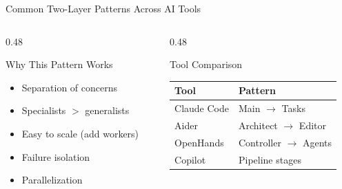 \documentclass[aspectratio=169,11pt]{beamer}
\begin{document}
\begin{frame}{Common Two-Layer Patterns Across AI Tools}
\begin{center}
\end{center}

\begin{columns}[T]
\begin{column}{0.48\textwidth}
\begin{block}{Why This Pattern Works}
\begin{itemize}
    \item Separation of concerns
    \item Specialists $>$ generalists
    \item Easy to scale (add workers)
    \item Failure isolation
    \item Parallelization
\end{itemize}
\end{block}
\end{column}
\begin{column}{0.48\textwidth}
\begin{exampleblock}{Tool Comparison}
\begin{tabular}{ll}
\textbf{Tool} & \textbf{Pattern} \\
\midrule
Claude Code & Main $\rightarrow$ Tasks \\
Aider & Architect $\rightarrow$ Editor \\
OpenHands & Controller $\rightarrow$ Agents \\
Copilot & Pipeline stages \\
\end{tabular}
\end{exampleblock}
\end{column}
\end{columns}
\end{frame}
\end{document}
